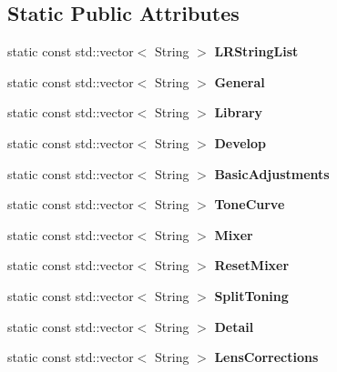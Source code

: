 \subsection*{Static Public Attributes}
\begin{DoxyCompactItemize}
\item 
static const std\+::vector$<$ String $>$ {\bfseries L\+R\+String\+List}\hypertarget{class_l_r_command_list_a95a8249becc79b12099005403f927a3d}{}\label{class_l_r_command_list_a95a8249becc79b12099005403f927a3d}

\item 
static const std\+::vector$<$ String $>$ {\bfseries General}\hypertarget{class_l_r_command_list_a6596b402092771f06a67d73be1d0f52c}{}\label{class_l_r_command_list_a6596b402092771f06a67d73be1d0f52c}

\item 
static const std\+::vector$<$ String $>$ {\bfseries Library}\hypertarget{class_l_r_command_list_a7c252ee33565d85c1b3180ef4e20db3b}{}\label{class_l_r_command_list_a7c252ee33565d85c1b3180ef4e20db3b}

\item 
static const std\+::vector$<$ String $>$ {\bfseries Develop}
\item 
static const std\+::vector$<$ String $>$ {\bfseries Basic\+Adjustments}\hypertarget{class_l_r_command_list_ad3dba4a1883a03d7411162ba9924bf51}{}\label{class_l_r_command_list_ad3dba4a1883a03d7411162ba9924bf51}

\item 
static const std\+::vector$<$ String $>$ {\bfseries Tone\+Curve}
\item 
static const std\+::vector$<$ String $>$ {\bfseries Mixer}\hypertarget{class_l_r_command_list_abc8fa08c7dfe651990e16a5c7cb44be7}{}\label{class_l_r_command_list_abc8fa08c7dfe651990e16a5c7cb44be7}

\item 
static const std\+::vector$<$ String $>$ {\bfseries Reset\+Mixer}\hypertarget{class_l_r_command_list_ac803d1a946af08d1cee97d5442c32b1f}{}\label{class_l_r_command_list_ac803d1a946af08d1cee97d5442c32b1f}

\item 
static const std\+::vector$<$ String $>$ {\bfseries Split\+Toning}
\item 
static const std\+::vector$<$ String $>$ {\bfseries Detail}
\item 
static const std\+::vector$<$ String $>$ {\bfseries Lens\+Corrections}\hypertarget{class_l_r_command_list_a536555bd29c161ad70ea5bdf9cdc8159}{}\label{class_l_r_command_list_a536555bd29c161ad70ea5bdf9cdc8159}


\end{DoxyCompactItemize}
